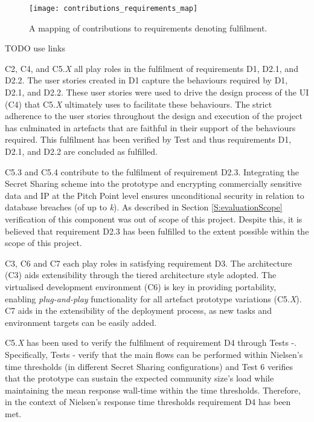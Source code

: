 \begin{figure}[ht]
    \centering
    \texttt{[image: contributions\_requirements\_map]}
    \caption{A mapping of contributions to requirements denoting fulfilment.}
    \label{fig:contribution_requirements_mapping}
\end{figure}

TODO use links

C2, C4, and C5.{\em X} all play roles in the fulfilment of requirements D1, D2.1, and D2.2. The user stories created in D1 capture the behaviours required by D1, D2.1, and D2.2. These user stories were used to drive the design process of the UI (C4) that C5.{\em X} ultimately uses to facilitate these behaviours. The strict adherence to the user stories throughout the design and execution of the project has culminated in artefacts that are faithful in their support of the behaviours required. This fulfilment has been verified by Test  and thus requirements D1, D2.1, and D2.2 are concluded as fulfilled.

C5.3 and C5.4 contribute to the fulfilment of requirement D2.3. Integrating the Secret Sharing scheme into the prototype and encrypting commercially sensitive data and IP at the Pitch Point level ensures unconditional security in relation to database breaches (of up to \textit{k}). As described in Section \ref{S:evaluationScope} verification of this component was out of scope of this project. Despite this, it is believed that requirement D2.3 has been fulfilled to the extent possible within the scope of this project.

C3, C6 and C7 each play roles in satisfying requirement D3. The architecture (C3) aids extensibility through the tiered architecture style adopted. The virtualised development environment (C6) is key in providing portability, enabling \textit{plug-and-play} functionality for all artefact prototype variations (C5.{\em X}). C7 aids in the extensibility of the deployment process, as new tasks and environment targets can be easily added.

C5.{\em X} has been used to verify the fulfilment of requirement D4 through Tests -. Specifically, Tests - verify that the main flows can be performed within Nielsen's time thresholds (in different Secret Sharing configurations) and Test 6 verifies that the prototype can sustain the expected community size's load while maintaining the mean response wall-time within the time thresholds. Therefore, in the context of Nielsen's response time thresholds requirement D4 has been met.

